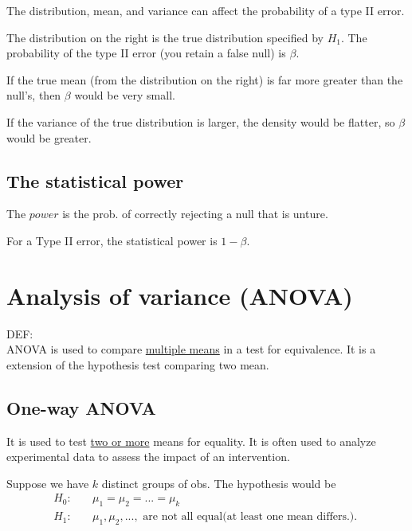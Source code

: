 \documentclass[12pt]{article}
\begin{document}
The distribution, mean, and variance can affect the probability
of a type II error. 

\begin{figure}[H]
\end{figure}



The distribution on the right is the true distribution specified by
$ H_1 $. The probability of the type II error (you retain a false
null) is $ \beta $.


If the true mean (from the distribution on the right) is far more
greater than the null's, then $ \beta $ would be very small.

If the variance of the true distribution is larger, the density
would be flatter, so $ \beta $ would be greater.



\subsection{The statistical power}

The $ power $ is the prob. of correctly rejecting a null that is 
unture.

For a Type II error, the statistical power is $ 1 - \beta $.




\section{Analysis of variance (ANOVA)}
DEF:\\
ANOVA is used to compare {\underline {multiple means}} in a test
for equivalence. It is a extension of the hypothesis test comparing
two mean.



\subsection{One-way ANOVA}

It is used to test {\underline {two or more}} means for equality.
It is often used to analyze experimental data to assess the impact
of an intervention.

Suppose we have $ k $ distinct groups of obs. The hypothesis would be
\begin{align*}
H_0:&\quad \mu_1 = \mu_2 = ... = \mu_{k}\\
H_1:&\quad \mu_1, \mu_2, ..., \text{ are not all equal(at least one
mean differs.). }
\end{align*}
\end{document}
